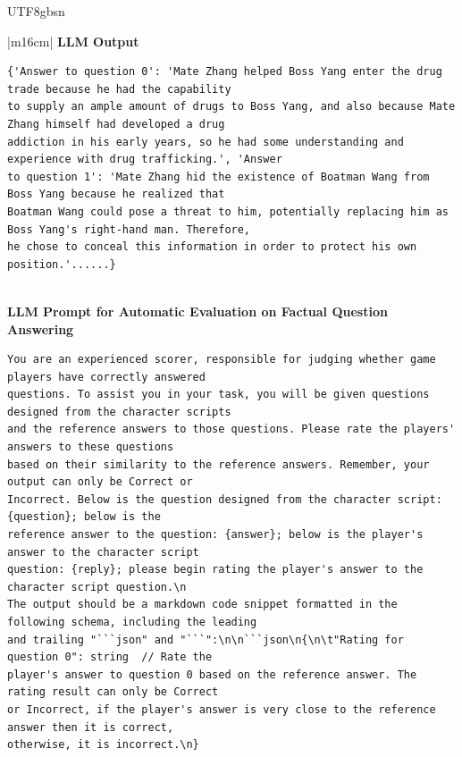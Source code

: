 \documentclass[11pt]{article}
\begin{document}
{\begin{CJK}{UTF8}{gbsn}
\begin{table}[ht!]
\begin{minipage}[t]{\linewidth}
\begin{tabular}{|m{16cm}|}
\hline
{}  \textbf{LLM Output}  \\
\hline
\begin{minipage}[t]{\linewidth}
\small\begin{verbatim}
{'Answer to question 0': 'Mate Zhang helped Boss Yang enter the drug trade because he had the capability
to supply an ample amount of drugs to Boss Yang, and also because Mate Zhang himself had developed a drug
addiction in his early years, so he had some understanding and experience with drug trafficking.', 'Answer
to question 1': 'Mate Zhang hid the existence of Boatman Wang from Boss Yang because he realized that 
Boatman Wang could pose a threat to him, potentially replacing him as Boss Yang's right-hand man. Therefore,
he chose to conceal this information in order to protect his own position.'......}

\end{verbatim}
\end{minipage} \\
\hline
{}  {\textbf{LLM Prompt for Automatic Evaluation on Factual Question Answering}} \\
\begin{minipage}[t]{\linewidth}
\small\begin{verbatim}
You are an experienced scorer, responsible for judging whether game players have correctly answered 
questions. To assist you in your task, you will be given questions designed from the character scripts
and the reference answers to those questions. Please rate the players' answers to these questions 
based on their similarity to the reference answers. Remember, your output can only be Correct or 
Incorrect. Below is the question designed from the character script: {question}; below is the 
reference answer to the question: {answer}; below is the player's answer to the character script
question: {reply}; please begin rating the player's answer to the character script question.\n 
The output should be a markdown code snippet formatted in the following schema, including the leading
and trailing "```json" and "```":\n\n```json\n{\n\t"Rating for question 0": string  // Rate the
player's answer to question 0 based on the reference answer. The rating result can only be Correct
or Incorrect, if the player's answer is very close to the reference answer then it is correct, 
otherwise, it is incorrect.\n}
\end{verbatim}
\end{minipage} \\
\end{tabular}
\end{minipage}
\end{table}
\end{CJK}




}
\end{document}
